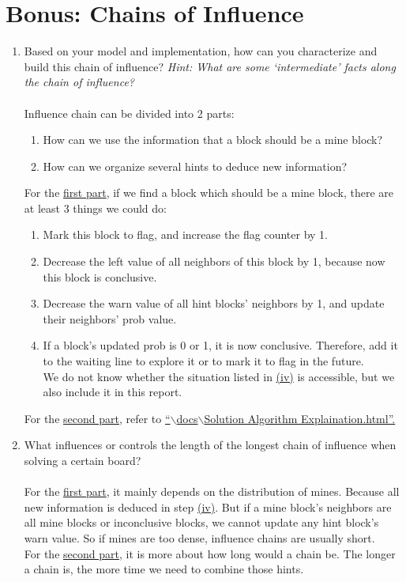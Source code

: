 \documentclass[letter]{article}
\begin{document}
\section{Bonus: Chains of Influence}
\begin{enumerate}
	\item {Based on your model and implementation, how can you characterize and build this chain of influence? \textit{Hint: What are some `intermediate' facts along the chain of influence?}} \\
	\\
	Influence chain can be divided into 2 parts:
	\begin{enumerate}
		\label{firstpart}
		\item {How can we use the information that a block should be a mine block?}
		\label{secondpart}
		\item {How can we organize several hints to deduce new information?}
	\end{enumerate}
	
	For the \hyperref[firstpart]{first part}, if we find a block which should be a mine block, there are at least 3 things we could do:
	\begin{enumerate}[label=(\roman*)]
		\item {Mark this block to flag, and increase the flag counter by 1.}
		\item {Decrease the left value of all neighbors of this block by 1, because now this block is conclusive.}
		\item {Decrease the warn value of all hint blocks’ neighbors by 1, and update their neighbors’ prob value.} 
		\label{step-d}
		\item {If a block’s updated prob is 0 or 1, it is now conclusive. Therefore, add it to the waiting line to explore it or to mark it to flag in the future.} \\
		We do not know whether the situation listed in \hyperref[step-d]{(iv)} is accessible, but we also include it in this report.
	\end{enumerate}
	
	For the \hyperref[secondpart]{second part}, refer to \href{run:Solution Algorithm Explaination.html}{``$ \backslash $docs$ \backslash $Solution Algorithm Explaination.html''.}
	
	\item {What influences or controls the length of the longest chain of influence when solving a certain board?} \\
	\\
	For the \hyperref[firstpart]{first part}, it mainly depends on the distribution of mines. Because all new information is deduced in step \hyperref[step-d]{(iv)}. But if a mine block’s neighbors are all mine blocks or inconclusive blocks, we cannot update any hint block’s warn value. So if mines are too dense, influence chains are usually short. \\
	For the \hyperref[secondpart]{second part}, it is more about how long would a chain be. The longer a chain is, the more time we need to combine those hints. \\
	

\end{enumerate}
\end{document}

